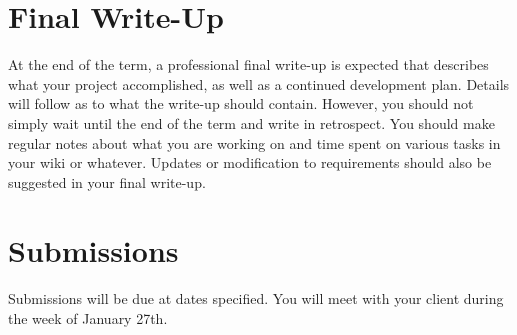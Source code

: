 \documentclass[letterpaper]{article}
\begin{document}
\section{Final Write-Up}

At the end of the term, a professional final write-up is expected that
describes what your project accomplished, as well as a continued development
plan.  Details will follow as to what the write-up should contain.  However,
you should not simply wait until the end of the term and write in retrospect.
You should make regular notes about what you are working on and time spent on
various tasks in your wiki or whatever.
Updates or modification to requirements should also be suggested in your final
write-up.

\section{Submissions}

Submissions will be due at dates specified.  You will meet with your client
during the week of January 27th. 

\end{document}
